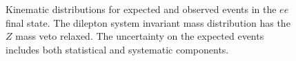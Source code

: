 \begin{figure}[!hbtp]
\begin{center}
\caption{Kinematic distributions for expected and observed events in the $ee$ final state.
The dilepton system invariant mass distribution has the $Z$ mass veto relaxed.
The uncertainty on the expected events includes both statistical and systematic components.}
\label{fig:eeplots}
\end{center}
\end{figure}

